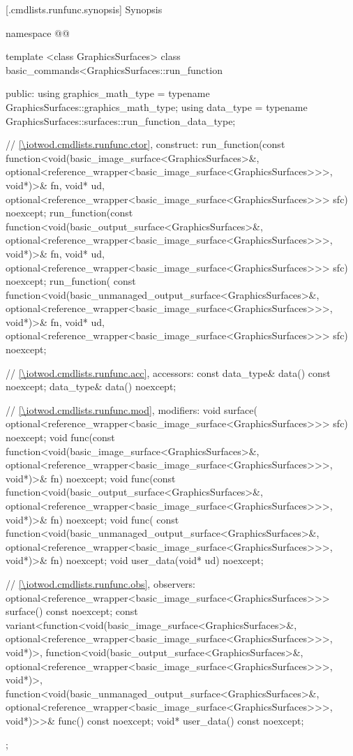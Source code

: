  [\iotwod.cmdlists.runfunc.synopsis] {Synopsis}
\begin{codeblock}
namespace @\fullnamespace{}@ {
  template <class GraphicsSurfaces>
  class basic_commands<GraphicsSurfaces::run_function {
  public:
    using graphics_math_type = typename GraphicsSurfaces::graphics_math_type;
    using data_type =
      typename GraphicsSurfaces::surfaces::run_function_data_type;

    // \ref{\iotwod.cmdlists.runfunc.ctor}, construct:
    run_function(const function<void(basic_image_surface<GraphicsSurfaces>&, 
      optional<reference_wrapper<basic_image_surface<GraphicsSurfaces>>>, 
      void*)>& fn, void* ud, 
      optional<reference_wrapper<basic_image_surface<GraphicsSurfaces>>> sfc) 
      noexcept;
    run_function(const function<void(basic_output_surface<GraphicsSurfaces>&, 
      optional<reference_wrapper<basic_image_surface<GraphicsSurfaces>>>, 
      void*)>& fn, void* ud, 
      optional<reference_wrapper<basic_image_surface<GraphicsSurfaces>>> sfc) 
      noexcept;
    run_function(
      const function<void(basic_unmanaged_output_surface<GraphicsSurfaces>&, 
      optional<reference_wrapper<basic_image_surface<GraphicsSurfaces>>>, 
      void*)>& fn, void* ud, 
      optional<reference_wrapper<basic_image_surface<GraphicsSurfaces>>> sfc) 
      noexcept;
    
    // \ref{\iotwod.cmdlists.runfunc.acc}, accessors:
    const data_type& data() const noexcept;
    data_type& data() noexcept;

    // \ref{\iotwod.cmdlists.runfunc.mod}, modifiers:
    void surface(
      optional<reference_wrapper<basic_image_surface<GraphicsSurfaces>>> sfc) 
      noexcept;
    void func(const function<void(basic_image_surface<GraphicsSurfaces>&, 
      optional<reference_wrapper<basic_image_surface<GraphicsSurfaces>>>, 
      void*)>& fn) noexcept;
    void func(const function<void(basic_output_surface<GraphicsSurfaces>&, 
      optional<reference_wrapper<basic_image_surface<GraphicsSurfaces>>>, 
      void*)>& fn) noexcept;
    void func(
      const function<void(basic_unmanaged_output_surface<GraphicsSurfaces>&, 
      optional<reference_wrapper<basic_image_surface<GraphicsSurfaces>>>, 
      void*)>& fn) noexcept;
    void user_data(void* ud) noexcept;

    // \ref{\iotwod.cmdlists.runfunc.obs}, observers:
    optional<reference_wrapper<basic_image_surface<GraphicsSurfaces>>> 
      surface() const noexcept;
    const variant<function<void(basic_image_surface<GraphicsSurfaces>&, 
      optional<reference_wrapper<basic_image_surface<GraphicsSurfaces>>>, 
      void*)>, function<void(basic_output_surface<GraphicsSurfaces>&, 
      optional<reference_wrapper<basic_image_surface<GraphicsSurfaces>>>, 
      void*)>, function<void(basic_unmanaged_output_surface<GraphicsSurfaces>&, 
      optional<reference_wrapper<basic_image_surface<GraphicsSurfaces>>>, 
      void*)>>& func() const noexcept;
    void* user_data() const noexcept;
  };

}
\end{codeblock}
